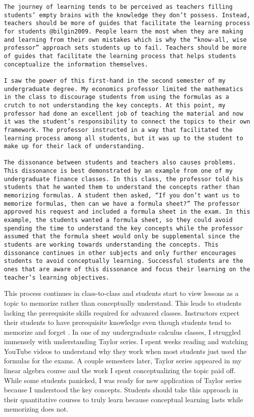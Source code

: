 \documentclass[11pt,]{article}
\begin{document}
\begin{verbatim}
The journey of learning tends to be perceived as teachers filling students’ empty brains with the knowledge they don’t possess. Instead, teachers should be more of guides that facilitate the learning process for students @bilgin2009. People learn the most when they are making and learning from their own mistakes which is why the “know-all, wise professor” approach sets students up to fail. Teachers should be more of guides that facilitate the learning process that helps students conceptualize the information themselves.

I saw the power of this first-hand in the second semester of my undergraduate degree. My economics professor limited the mathematics in the class to discourage students from using the formulas as a crutch to not understanding the key concepts. At this point, my professor had done an excellent job of teaching the material and now it was the student’s responsibility to connect the topics to their own framework. The professor instructed in a way that facilitated the learning process among all students, but it was up to the student to make up for their lack of understanding. 

The dissonance between students and teachers also causes problems. This dissonance is best demonstrated by an example from one of my undergraduate finance classes. In this class, the professor told his students that he wanted them to understand the concepts rather than memorizing formulas. A student then asked, “If you don’t want us to memorize formulas, then can we have a formula sheet?” The professor approved his request and included a formula sheet in the exam. In this example, the students wanted a formula sheet, so they could avoid spending the time to understand the key concepts while the professor assumed that the formula sheet would only be supplemental since the students are working towards understanding the concepts. This dissonance continues in other subjects and only further encourages students to avoid conceptually learning. Successful students are the ones that are aware of this dissonance and focus their learning on the teacher’s learning objectives. 
\end{verbatim}

This process continues in class-to-class and students start to view
lessons as a topic to memorize rather than conceptually understand. This
leads to students lacking the prerequisite skills required for advanced
classes. Instructors expect their students to have prerequisite
knowledge even though students tend to memorize and forget
\citet{kennedy1998}. In one of my undergraduate calculus classes, I
struggled immensely with understanding Taylor series. I spent weeks
reading and watching YouTube videos to understand why they work when
most students just used the formulas for the exams. A couple semesters
later, Taylor series appeared in my linear algebra course and the work I
spent conceptualizing the topic paid off. While some students panicked,
I was ready for new application of Taylor series because I understood
the key concepts. Students should take this approach in their
quantitative courses to truly learn because conceptual learning lasts
while memorizing does not.
\end{document}
